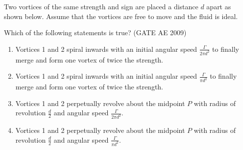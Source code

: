\iffalse
\chapter{2009}
\author{AI24BTECH11030}
\section{ae}
\fi

    \item Two vortices of the same strength and sign are placed a distance $d$ apart as shown below. Assume that the vortices are free to move and the fluid is ideal.
    \begin{center}
        
    \end{center}
    Which of the following statements is true?  \hfill (GATE AE 2009)
    \begin{enumerate}
        \item Vortices 1 and 2 spiral inwards with an initial angular speed $\frac{\Gamma}{2\pi d^2}$ to finally merge and form one vortex of twice the strength.
        \item Vortices 1 and 2 spiral inwards with an initial angular speed $\frac{\Gamma}{\pi d^2}$ to finally merge and form one vortex of twice the strength.
        \item Vortices 1 and 2 perpetually revolve about the midpoint $P$ with radius of revolution $\frac{d}{2}$ and angular speed $\frac{\Gamma}{2\pi d^2}$.
        \item Vortices 1 and 2 perpetually revolve about the midpoint $P$ with radius of revolution $\frac{d}{2}$ and angular speed $\frac{\Gamma}{\pi d^2}$.
    \end{enumerate}

